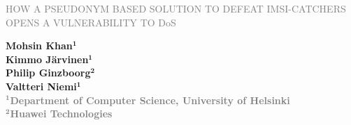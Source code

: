 \documentclass[portrait,a0]{a0poster}
\begin{document}



\begin{multicols}{2} 
\begin{minipage}[t]{1.5\linewidth}
\vspace{10pt}
\begin{flushleft}
\begin{spacing}{5}
{\huge{}\textcolor{gray}{\MakeUppercase{How a Pseudonym Based Solution to Defeat IMSI-catchers Opens a Vulnerability to} DoS} \MakeUppercase{}} \\

\end{spacing}
\end{flushleft}
\end{minipage}

\begin{minipage}[t]{.95\linewidth} %
\vspace{-110pt} %
\begin{flushright}
\textsf{\bfseries
Mohsin Khan$^\textbf{1}$ \\
Kimmo Järvinen$^\textbf{1}$\\
Philip Ginzboorg$^\textbf{2}$\\
Valtteri Niemi$^\textbf{1}$\\
} %
\textcolor{gray}{\textsf{\bfseries{$^\textbf{1}$Department of Computer Science, University of Helsinki}}}\\
\textcolor{gray}{\textsf{\bfseries{$^\textbf{2}$Huawei Technologies}}}
\end{flushright}
\end{minipage}
\end{multicols}

\vspace{-70pt}
\noindent\makebox[\linewidth]{\rule{\paperwidth}{5pt}}
\end{document}
